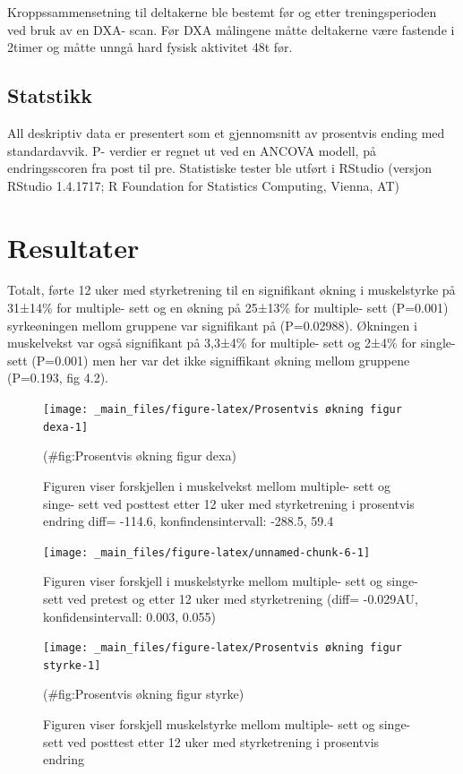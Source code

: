 \documentclass[
]{book}
\begin{document}
Kroppssammensetning til deltakerne ble bestemt før og etter treningsperioden ved bruk av en DXA- scan. Før DXA målingene måtte deltakerne være fastende i 2timer og måtte unngå hard fysisk aktivitet 48t før. ~

\hypertarget{statstikk}{%
\subsection{Statstikk}\label{statstikk}}

All deskriptiv data er presentert som et gjennomsnitt av prosentvis ending med standardavvik. P- verdier er regnet ut ved en ANCOVA modell, på endringsscoren fra post til pre. Statistiske tester ble utført i RStudio (versjon RStudio 1.4.1717; R Foundation for Statistics Computing, Vienna, AT)

\hypertarget{resultater}{%
\section{Resultater}\label{resultater}}

Totalt, førte 12 uker med styrketrening til en signifikant økning i muskelstyrke på 31±14\% for multiple- sett og en økning på 25±13\% for multiple- sett (P=0.001) syrkeøningen mellom gruppene var signifikant på (P=0.02988). Økningen i muskelvekst var også signifikant på 3,3±4\% for multiple- sett og 2±4\% for single- sett (P=0.001) men her var det ikke signiffikant økning mellom gruppene (P=0.193, fig 4.2).

\begin{figure}
\texttt{[image: \_main\_files/figure-latex/Prosentvis økning figur dexa-1]} \caption{Figuren viser forskjellen i muskelvekst mellom multiple- sett og singe- sett ved posttest etter 12 uker med styrketrening i prosentvis endring diff= -114.6, konfindensintervall: -288.5, 59.4}(\#fig:Prosentvis økning figur dexa)
\end{figure}

\begin{figure}
\texttt{[image: \_main\_files/figure-latex/unnamed-chunk-6-1]} \caption{Figuren viser forskjell i muskelstyrke mellom multiple- sett og singe- sett ved pretest og etter 12 uker med styrketrening (diff= -0.029AU, konfidensintervall: 0.003, 0.055)}\label{fig:unnamed-chunk-6}
\end{figure}

\begin{figure}
\texttt{[image: \_main\_files/figure-latex/Prosentvis økning figur styrke-1]} \caption{Figuren viser forskjell muskelstyrke mellom multiple- sett og singe- sett ved posttest etter 12 uker med styrketrening i prosentvis endring}(\#fig:Prosentvis økning figur styrke)
\end{figure}
\end{document}
